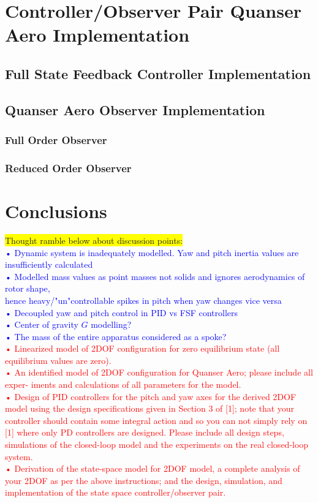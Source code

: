 \documentclass[11pt]{article}
\begin{document}
\section{Controller/Observer Pair Quanser Aero Implementation}

\subsection{Full State Feedback Controller Implementation}

\subsection{Quanser Aero Observer Implementation}

\subsubsection{Full Order Observer}

\subsubsection{Reduced Order Observer}

\section{Conclusions}
\colorbox{yellow}{Thought ramble below about discussion points:}\\
\textcolor{blue}{• Dynamic system is inadequately modelled. Yaw and pitch inertia values are insufficiently calculated\\
• Modelled mass values as point masses not solids and ignores aerodynamics of rotor shape, \\hence heavy/"un"controllable spikes in pitch when yaw changes vice versa\\
• Decoupled yaw and pitch control in PID vs FSF controllers\\
• Center of gravity $G$ modelling?\\
• The mass of the entire apparatus considered as a spoke?}\\

\textcolor{red}{
• Linearized model of 2DOF configuration for zero equilibrium state (all equilibrium values are zero).\\
• An identified model of 2DOF configuration for Quanser Aero; please include all exper- iments and calculations of all parameters for the model.\\
• Design of PID controllers for the pitch and yaw axes for the derived 2DOF model using the design specifications given in Section 3 of [1]; note that your controller should contain some integral action and so you can not simply rely on [1] where only PD controllers are designed. Please include all design steps, simulations of the closed-loop model and the experiments on the real closed-loop system.\\
• Derivation of the state-space model for 2DOF model, a complete analysis of your 2DOF as per the above instructions; and the design, simulation, and implementation of the state space controller/observer pair.}
\end{document}
